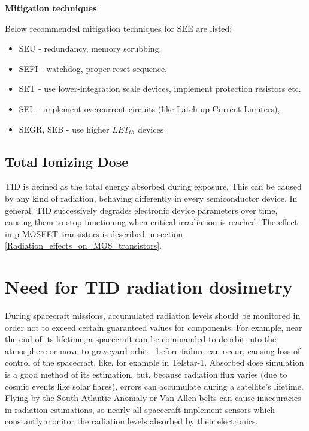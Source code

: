         \bigskip\textbf{Mitigation techniques}

        Below recommended mitigation techniques for SEE are listed:
        \begin{itemize}
            \item SEU - redundancy, memory scrubbing,
            \item SEFI - watchdog, proper reset sequence,
            \item SET - use lower-integration scale devices, implement protection resistors etc.
            \item SEL - implement overcurrent circuits (like Latch-up Current Limiters),
            \item SEGR, SEB - use higher $LET_{th}$ devices
        \end{itemize}

    \subsection{Total Ionizing Dose}
        TID is defined as the total energy absorbed during exposure. This can be caused by any kind of radiation, behaving differently in every semiconductor device. In general, TID successively degrades electronic device parameters over time, causing them to stop functioning when critical irradiation is reached. The effect in p-MOSFET transistors is described in section \ref{Radiation_effects_on_MOS_transistors}.

\section{Need for TID radiation dosimetry}
    During spacecraft missions, accumulated radiation levels should be monitored in order not to exceed certain guaranteed values for components. For example, near the end of its lifetime, a spacecraft can be commanded to deorbit into the atmosphere or move to graveyard orbit - before failure can occur, causing loss of control of the spacecraft, like, for example in Telstar-1.
    Absorbed dose simulation is a good method of its estimation, but, because radiation flux varies (due to cosmic events like solar flares), errors can accumulate during a satellite's lifetime. Flying by the South Atlantic Anomaly or Van Allen belts can cause inaccuracies in radiation estimations, so nearly all spacecraft implement sensors which constantly monitor the radiation levels absorbed by their electronics.

